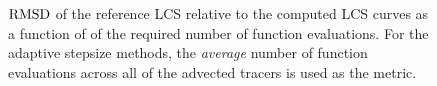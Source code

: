 \begin{figure}[htpb]
    \centering
        
    \caption[$\rmsd$ of the reference LCS relative to the computed LCS
    curves relative a function of the required number of function evaluations]
    {$\rmsd$ of the reference LCS relative to the computed LCS curves as a
        function of of the required number of function evaluations. For the
        adaptive stepsize methods, the \emph{average} number of function
    evaluations across all of the advected tracers is used as the metric.}
    \label{fig:lcs_rmsd_fn_nn_both}
\end{figure}
